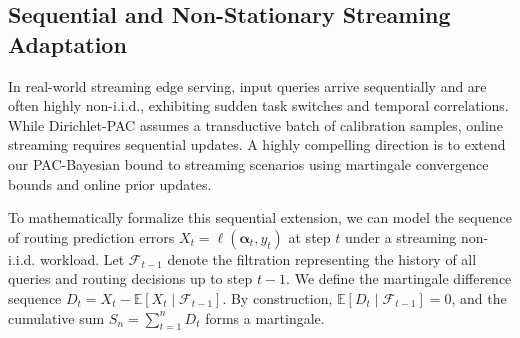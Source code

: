 \subsection{Sequential and Non-Stationary Streaming Adaptation}
In real-world streaming edge serving, input queries arrive sequentially and are often highly non-i.i.d., exhibiting sudden task switches and temporal correlations. While Dirichlet-PAC assumes a transductive batch of calibration samples, online streaming requires sequential updates. A highly compelling direction is to extend our PAC-Bayesian bound to streaming scenarios using martingale convergence bounds and online prior updates. 

To mathematically formalize this sequential extension, we can model the sequence of routing prediction errors $X_t = \ell(\boldsymbol{\alpha}_t, y_t)$ at step $t$ under a streaming non-i.i.d. workload. Let $\mathcal{F}_{t-1}$ denote the filtration representing the history of all queries and routing decisions up to step $t-1$. We define the martingale difference sequence $D_t = X_t - \mathbb{E}[X_t \mid \mathcal{F}_{t-1}]$. By construction, $\mathbb{E}[D_t \mid \mathcal{F}_{t-1}] = 0$, and the cumulative sum $S_n = \sum_{t=1}^n D_t$ forms a martingale.


